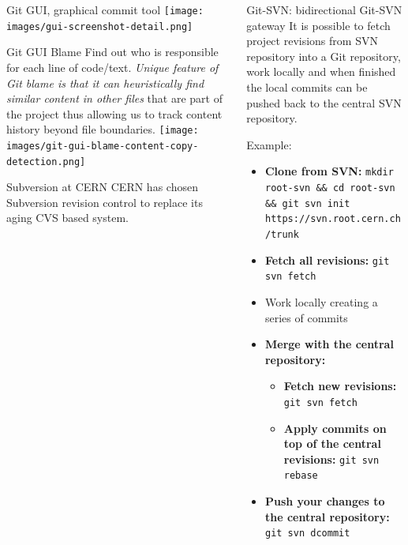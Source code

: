 \documentclass[final,hyperref={pdfpagelabels=false},notitlepage=true]{beamer}
\begin{document}
\begin{frame}{}
\begin{columns}[t]
\begin{column}{0.45\linewidth}
    \vskip2cm
    \begin{block}{\large Git GUI, graphical commit tool}
    \vskip1cm
      \texttt{[image: images/gui-screenshot-detail.png]}
    \end{block}

    \vskip2cm
    \begin{block}{\large Git GUI Blame}
    \vskip1cm
      Find out who is responsible for each line of code/text. \emph{Unique
      feature of Git blame is that it can heuristically find similar
      content in other files} that are part of the project thus
      allowing us to track content history beyond file boundaries.
      \texttt{[image: images/git-gui-blame-content-copy-detection.png]}
    \end{block}

    \vskip2cm
    \begin{block}{\large Subversion at CERN}
    \vskip1cm
      CERN has chosen Subversion revision control to replace its aging CVS based system.
    \end{block}

    \end{column}
      \begin{column}{0.45\linewidth}

	\begin{block}{\large Git-SVN: bidirectional Git-SVN gateway}
          \vskip1cm
	  It is possible to fetch project revisions from SVN repository into a Git 
          repository, work locally and when finished the local commits
          can be pushed back to the central SVN repository.

          \vskip1cm
          Example:
          \begin{itemize}
            \item {\bf Clone from SVN:} {\tt mkdir root-svn \&\& cd root-svn \&\& git svn init https://svn.root.cern.ch/trunk}
            \item {\bf Fetch all revisions:} {\tt git svn fetch}
            \item Work locally creating a series of commits
            \item {\bf Merge with the central repository:}
              \begin{itemize}
                \item {\bf Fetch new revisions:} {\tt git svn fetch}
                \item {\bf Apply commits on top of the central revisions:} {\tt git svn rebase}
              \end{itemize}
            \item {\bf Push your changes to the central repository:} {\tt git svn dcommit}
          \end{itemize}


\end{block}
\end{column}
\end{columns}
\end{frame}
\end{document}
